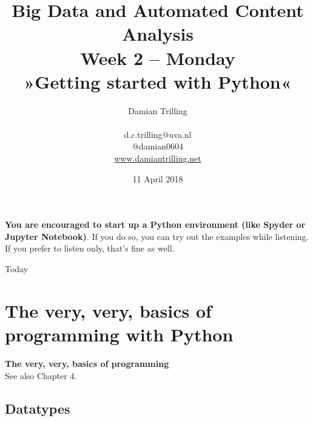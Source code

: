 \documentclass{beamer}
\begin{document}
\title[Big Data and Automated Content Analysis]{\textbf{Big Data and Automated Content Analysis} \\ Week 2 -- Monday \\ »Getting started with Python«}
\author[Damian Trilling]{Damian Trilling \\ ~ \\ \footnotesize{d.c.trilling@uva.nl \\@damian0604} \\ \url{www.damiantrilling.net}}
\date{11 April 2018}


\begin{frame}[plain]
\huge{\textbf{You are encouraged to start up a Python environment (like Spyder or Jupyter Notebook)}. If you do so, you can try out the examples while listening. If you prefer to listen only, that's fine as well.}
\end{frame}


\begin{frame}{}
\titlepage
\end{frame}

\begin{frame}{Today}
\tableofcontents
\end{frame}


\section[Basics]{The very, very, basics of programming with Python}
\begin{frame}[plain]
\textbf{The very, very, basics of programming}\\
\vspace{1cm}
See also Chapter 4.
\end{frame}
\subsection{Datatypes}
\end{document}
